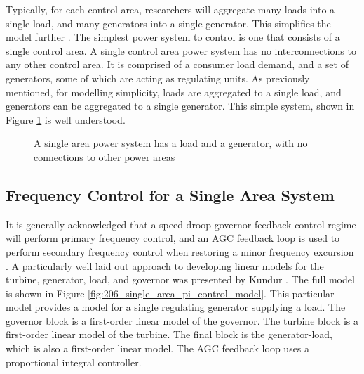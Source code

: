 Typically, for each control area, researchers will aggregate many loads into a single load, and many generators into a single generator. This simplifies the model further \cite{Grainger1994}. The simplest power system to control is one that consists of a single control area. A single control area power system has no interconnections to any other control area. It is comprised of a consumer load demand, and a set of generators, some of which are acting as regulating units. As previously mentioned, for modelling simplicity, loads are aggregated to a single load, and generators can be aggregated to a single generator. This simple system, shown in Figure \ref{fig:205a_single_area_system_overview} is well understood.

\begin{figure}[h]
	\centering
	\resizebox{4.5cm}{!}{}
	\caption[Single area power system]{A single area power system has a load and a generator, with no connections to other power areas}
	\label{fig:205a_single_area_system_overview}
\end{figure}


\subsection{Frequency Control for a Single Area System}\label{oneareapowersystem}
It is generally acknowledged that a speed droop governor feedback control regime will perform primary frequency control, and an AGC feedback loop is used to perform secondary frequency control when restoring a minor frequency excursion \cite{Wood2013, Grainger1994, Kothari2011, Kundur1994}. A particularly well laid out approach to developing linear models for the turbine, generator, load, and governor was presented by Kundur \cite{Kundur1994}. The full model is shown in Figure \ref{fig:206_single_area_pi_control_model}. This particular model provides a model for a single regulating generator supplying a load. The governor block is a first-order linear model of the governor. The turbine block is a first-order linear model of the turbine. The final block is the generator-load, which is also a first-order linear model. The AGC feedback loop uses a proportional integral controller.

\clearpage

\begin{sidewaysfigure}[ht]
\centering

\caption[Single power area with PI feedback control]{A classical feedback control approach for a single control area power system. The system is comprised of a first order models for both turbines, and generators. The governor controllers are also first order models. AGC is implemented using an integral control block in a feedback loop \cite{Kundur1994}.}
\label{fig:206_single_area_pi_control_model}
\end{sidewaysfigure}

